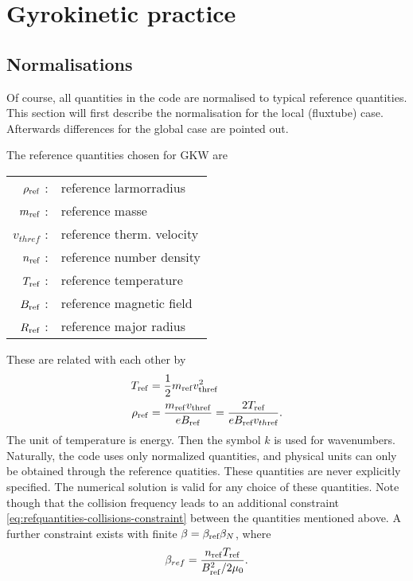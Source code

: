 
\chapter{Gyrokinetic practice}

\section{Normalisations} 
\label{sec:normalisation}

Of course, all quantities in the code are normalised to typical reference quantities. 
This section will first describe the normalisation for the local (fluxtube) case. Afterwards differences for the global case are pointed out.

The reference quantities chosen for GKW are\\
\begin{tabular}{rl}
  \label{eq:refquantities}
  $\rho_{\text{ref}} $ : & reference larmorradius \\
  $m_{\text{ref}} $ : & reference masse \\
  $v_{thref}$ : & reference therm. velocity \\
  $n_{\text{ref}} $ : & reference number density \\
  $T_{\text{ref}} $ : & reference temperature \\
  $B_{\text{ref}} $ : & reference magnetic field \\
  $R_{\text{ref}} $ : & reference major radius \\
\end{tabular}

These are related with each other by 
\begin{align}
T_{\rm ref} &= \frac{1}{2} m_{\rm ref} v_{\rm thref}^2  
\label{eq:normalise-Tref}
\\
\rho_{\rm ref} &= {m_{\rm ref} v_{\rm thref} \over e B_{\rm ref}} = \frac{2T_{\text{ref}}}{eB_{\text{ref}} v_{th\text{ref}}}.
\end{align}
The unit of temperature is energy. Then the symbol $k$ is used for
wavenumbers.  Naturally, the code uses only normalized quantities, and
physical units can only be obtained through the reference quatities.
These quantities are never explicitly specified. The numerical
solution is valid for any choice of these quantities. Note though that
the collision frequency leads to an additional constraint 
\eqref{eq:refquantities-collisions-constraint} between the
quantities mentioned above.
A further constraint exists with finite $\beta = \beta_{\text{ref}} \beta_N$, where 
\begin{equation} 
\label{eq:betaref}
\beta_{ref} = {n_{\rm ref} T_{\rm ref} \over B_{\rm ref}^2 / 2 \mu_0} .
\end{equation}

